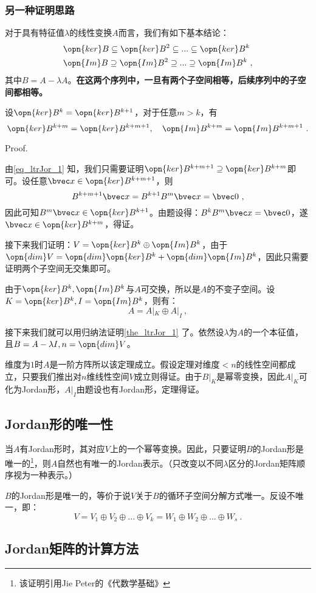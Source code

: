 \subsubsection{另一种证明思路}
对于具有特征值$\lambda$的线性变换$A$而言，我们有如下基本结论：
\begin{equation}\label{eq_ltrJor_1}
\begin{aligned}
&\opn{ker}B\subseteq\opn{ker}B^2\subseteq...\subseteq\opn{ker}B^k\\
&\opn{Im}B\supseteq\opn{Im}B^2\supseteq...\supseteq\opn{Im}B^k~,
\end{aligned}
\end{equation}
其中$B=A-\lambda A$。\textbf{在这两个序列中，一旦有两个子空间相等，后续序列中的子空间都相等。}
\begin{lemma}{}
设$\opn{ker}B^k=\opn{ker}B^{k+1}$，对于任意$m>k$，有\begin{equation}
\opn{ker}B^{k+m}=\opn{ker}B^{k+m+1},\quad\opn{Im}B^{k+m}=\opn{Im}B^{k+m+1}~.
\end{equation}
\end{lemma}
Proof.

由\autoref{eq_ltrJor_1} 知，我们只需要证明$\opn{ker}B^{k+m+1}\supseteq \opn{ker}B^{k+m}$即可。设任意$\bvec x\in \opn{ker}B^{k+m+1}$，则
\begin{equation}
B^{k+m+1}\bvec x=B^{k+1}B^m\bvec x=\bvec 0~,
\end{equation}
因此可知$B^m\bvec x\in\opn{ker}B^{k+1}$。由题设得：$B^{k}B^m\bvec x=\bvec 0$，遂$\bvec x\in\opn{ker}B^{k+m}$，得证。

接下来我们证明：$V=\opn{ker}B^k\oplus\opn{Im}B^k$，由于$\opn{dim}V=\opn{dim}\opn{ker}B^k+\opn{dim}\opn{Im}B^k$，因此只需要证明两个子空间无交集即可。

由于$\opn{ker}B^k,\opn{Im}B^k$与$A$可交换，所以是$A$的不变子空间。设$K=\opn{ker}B^k,I=\opn{Im}B^k$，则有：
\begin{equation}
A=A|_K\oplus A|_I~,
\end{equation}

接下来我们就可以用归纳法证明\autoref{the_ltrJor_1} 了。依然设$\lambda$为$A$的一个本征值，且$B=A-\lambda I,n=\opn{dim}V$。

维度为$1$时$A$是一阶方阵所以该定理成立。假设定理对维度$<n$的线性空间都成立，只要我们推出对$n$维线性空间$V$成立则得证。由于$B|_K$是幂零变换，因此$A|_K$可化为Jordan形，$A|_I$由题设也有Jordan形，定理得证。
\subsection{Jordan形的唯一性}
当$A$有Jordan形时，其对应$V$上的一个幂等变换。因此，只要证明$B$的Jordan形是唯一的\footnote{该证明引用Jie Peter的《代数学基础》}，则$A$自然也有唯一的Jordan表示。（只改变以不同$\lambda$区分的Jordan矩阵顺序视为一种表示。）

$B$的Jordan形是唯一的，等价于说$V$关于$B$的循环子空间分解方式唯一。反设不唯一，即：
\begin{equation}
V=V_1\oplus V_2\oplus...\oplus V_k=W_1\oplus W_2\oplus...\oplus W_s~.
\end{equation}

\subsection{Jordan矩阵的计算方法}